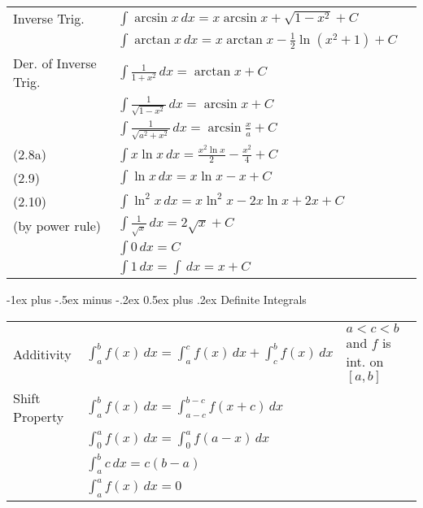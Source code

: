 \documentclass[a4paper,12pt]{article}
\makeatletter
\renewcommand{\section}{\@startsection{section}{1}{0mm}%
                                {-1ex plus -.5ex minus -.2ex}%
                                {0.5ex plus .2ex}%
                                {\normalfont\large\bfseries}}
\makeatother
\begin{document}
\begin{multicols}{2}
\begin{tabular}{@{}ll@{}l@{}}
Inverse Trig. &  $\displaystyle\int \arcsin x \, dx=x\arcsin x+\sqrt{ 1-x^2 }+C$ \\	

& $\displaystyle\int \arctan x \, dx=x\arctan x-\frac{1}{2}\ln(x^2+1)+C$ \\
 
Der. of Inverse Trig. & $\displaystyle\int \frac{1}{1 + x^2} \, dx = \arctan x + C$ \\
& $\displaystyle\int \frac{1}{\sqrt{1 - x^2}} \, dx = \arcsin x + C$ \\
& $\displaystyle\int \frac{1}{\sqrt{ a^2+x^2 }} \, dx=\arcsin \frac{x}{a}+C$ \\



(2.8a) & $\displaystyle\int x\ln x \, dx=\frac{x^2\ln x}{2}-\frac{x^2}{4}+C$ \\
(2.9) & $\displaystyle\int \ln x \, dx=x\ln x-x+C$ \\
(2.10) & $\displaystyle\int \ln^2x \, dx=x\ln^2x-2x\ln x+2x+C$ \\
(by power rule) & $\int \frac{1}{\sqrt{ x }} \, dx=2\sqrt{ x }+C$ \\
& $\int 0 \, dx=C$ \\
& $\int 1 \, dx=\int  \, dx=x+C$ \\

\end{tabular}


\newpage

\section{Definite Integrals}

\begin{tabular}{@{}ll@{}l@{}}   
Additivity & $\int_{a}^{b} f(x) \, dx = \int_{a}^{c} f(x) \, dx + \int_{c}^{b} f(x) \, dx$ &  $a<c<b$ and $f$ is int. on $[a,b]$ \\
Shift Property & $\int_{a}^{b} f(x) \, dx = \int_{a-c}^{b-c} f(x+c) \, dx$ \\
& $\int_{0}^{a} f(x) \, dx = \int_{0}^{a} f(a-x) \, dx$ \\
& $\int_{a}^{b} c \, dx = c(b-a)$ \\
& $\int_{a}^{a} f(x) \, dx = 0$ \\


\end{tabular}


\end{multicols}
\end{document}
